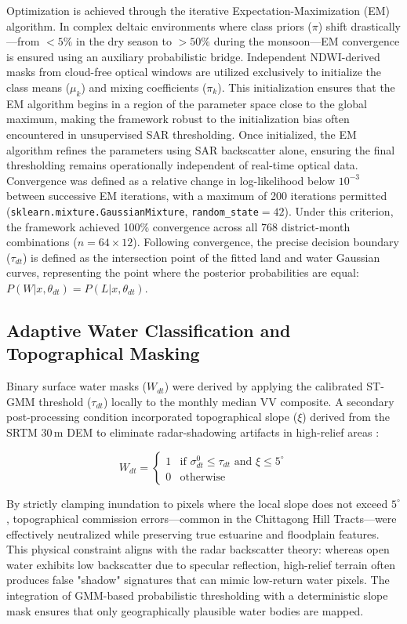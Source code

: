 \documentclass[fleqn,10pt,twocolumn]{article}
\begin{document}
Optimization is achieved through the iterative Expectation-Maximization (EM) algorithm. In complex deltaic environments where class priors ($\pi$) shift drastically---from $<5\%$ in the dry season to $>50\%$ during the monsoon---EM convergence is ensured using an auxiliary probabilistic bridge. Independent NDWI-derived masks from cloud-free optical windows are utilized exclusively to initialize the class means ($\mu_k$) and mixing coefficients ($\pi_k$). This initialization ensures that the EM algorithm begins in a region of the parameter space close to the global maximum, making the framework robust to the initialization bias often encountered in unsupervised SAR thresholding. Once initialized, the EM algorithm refines the parameters using SAR backscatter alone, ensuring the final thresholding remains operationally independent of real-time optical data. Convergence was defined as a relative change in log-likelihood below $10^{-3}$ between successive EM iterations, with a maximum of 200 iterations permitted (\texttt{sklearn.mixture.GaussianMixture}, \texttt{random\_state}$=42$). Under this criterion, the framework achieved 100\% convergence across all 768 district-month combinations ($n=64 \times 12$). Following convergence, the precise decision boundary ($\tau_{dt}$) is defined as the intersection point of the fitted land and water Gaussian curves, representing the point where the posterior probabilities are equal: $P(W | x, \theta_{dt}) = P(L | x, \theta_{dt})$.

\subsection{Adaptive Water Classification and Topographical Masking}
Binary surface water masks ($W_{dt}$) were derived by applying the calibrated ST-GMM threshold ($\tau_{dt}$) locally to the monthly median VV composite. A secondary post-processing condition incorporated topographical slope ($\xi$) derived from the SRTM 30\,m DEM to eliminate radar-shadowing artifacts in high-relief areas \cite{twele2016}:

\begin{equation}
W_{dt} =
\begin{cases}
1 & \text{if } \sigma^{0}_{dt} \leq \tau_{dt} \text{ and } \xi \leq 5^{\circ} \\
0 & \text{otherwise}
\end{cases}
\label{eq:threshold}
\end{equation}

By strictly clamping inundation to pixels where the local slope does not exceed $5^{\circ}$, topographical commission errors—common in the Chittagong Hill Tracts—were effectively neutralized while preserving true estuarine and floodplain features. This physical constraint aligns with the radar backscatter theory: whereas open water exhibits low backscatter due to specular reflection, high-relief terrain often produces false "shadow" signatures that can mimic low-return water pixels. The integration of GMM-based probabilistic thresholding with a deterministic slope mask ensures that only geographically plausible water bodies are mapped.
\end{document}
